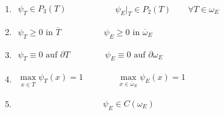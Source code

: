 \begin{lemma}[Eigenschaften]\ %
	\begin{enumerate}[label=\roman*)]
	\item $\begin{aligned}
		\psi_T\in P_3(T)
		\end{aligned}
		\hspace{64pt}
		\psi_E\big|_T\in P_2(T)\qquad\forall T\in\omega_E$
	\item $\begin{aligned}
		\psi_T\geq0\text{ in }\overline{T}
		\hspace{61pt}
		\psi_E\geq 0\text{ in }\overline{\omega}_E
		\end{aligned}$
	\item $\begin{aligned}
		\psi_T\equiv0\text{ auf }\partial T
		\hspace{50pt}
		\psi_E\equiv 0\text{ auf }\partial\omega_E
		\end{aligned}$
	\item $\begin{aligned}
		\max\limits_{x\in\overline{T}}\psi_T(x)=1
		\hspace{48pt}
		\max\limits_{x\in\overline{\omega}_E}\psi_E(x)=1
		\end{aligned}$
	\item $\begin{aligned}
		\hspace{120pt}
		\psi_E\in C(\omega_E)
		\end{aligned}$
	\end{enumerate}
\end{lemma}

